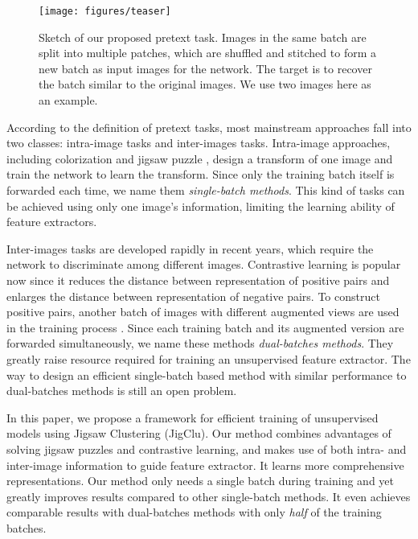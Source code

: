 \documentclass[final]{cvpr}
\begin{document}
\begin{figure}
	\centering
	\texttt{[image: figures/teaser]}
	\caption{Sketch of our proposed pretext task. Images in the same batch are split into multiple patches, which are shuffled and stitched to form a new batch as input images for the network. The target is to recover the batch similar to the original images. We use two images here as an example.}
	\label{fig:teaser}
	\vspace{-0.1in}
\end{figure}


According to the definition of pretext tasks, most mainstream approaches fall into two classes: intra-image tasks and inter-images tasks. Intra-image approaches, including colorization \cite{colorization,autocolor} and jigsaw puzzle \cite{jigpuz}, design a transform of one image and train the network to learn the transform. Since only the training batch itself is forwarded each time, we name them {\it single-batch methods}. This kind of tasks can be achieved using only one image's information, limiting the learning ability of feature extractors. 

Inter-images tasks are developed rapidly in recent years, which require the network to discriminate among different images. Contrastive learning is popular now since it reduces the distance between representation of positive pairs and enlarges the distance between representation of negative pairs. To construct positive pairs, another batch of images with different augmented views are used in the training process \cite{simclr,moco,pirl}. Since each training batch and its augmented version are forwarded simultaneously, we name these methods {\it dual-batches methods}. They greatly raise resource required for training an unsupervised feature extractor. The way to design an efficient single-batch based method with similar performance to dual-batches methods is still an open problem.

In this paper, we propose a framework for efficient training of unsupervised models using Jigsaw Clustering (JigClu). Our method combines advantages of solving jigsaw puzzles and contrastive learning, and makes use of both intra- and inter-image information to guide feature extractor. It learns more comprehensive representations. Our method only needs a single batch during training and yet greatly improves results compared to other single-batch methods. It even achieves comparable results with dual-batches methods with only {\it half} of the training batches. 
\end{document}
